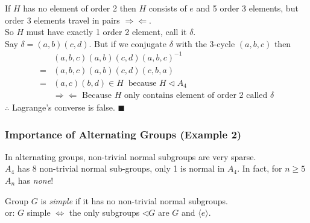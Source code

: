 If $H$ has no element of order 2 then $H$ consists of $e$ and 5 order 3 elements, but order 3 elements travel in pairs $\Rightarrow \Leftarrow$. \steezybreak\\

\noindent So $H$ must have exactly 1 order 2 element, call it $\delta$. \\
\noindent Say $\delta = (a,b)(c,d)$. But if we conjugate $\delta$ with the 3-cycle $(a,b,c)$ then
\begin{align}
    &(a,b,c)(a,b)(c,d)(a,b,c)^{-1} \nonumber \\
    =&(a,b,c)(a,b)(c,d)(c,b,a) \nonumber \\
    =&(a,c)(b,d) \in H \ \text{ because } H\triangleleft A_4 \nonumber \\
    &\Rightarrow\Leftarrow \text{ Because $H$ only contains element of order 2 called $\delta$}\nonumber
\end{align}
$\therefore$ Lagrange's converse is false. $\blacksquare$

\subsubsection{Importance of Alternating Groups (Example 2)}
In alternating groups, non-trivial normal subgroups are very sparse. \steezybreak\\
$A_4$ has 8 non-trivial normal sub-groups, only 1 is normal in $A_4$. In fact, for $n\geq 5$ $A_n$ has \textit{none}!

\begin{definition}
Group $G$ is \textit{simple} if it has no non-trivial normal subgroups. \steezybreak\\
\noindent or:  $G$ simple $\iff$ the only subgroups $\triangleleft G$ are $G$ and $\langle e \rangle$.
\end{definition}


